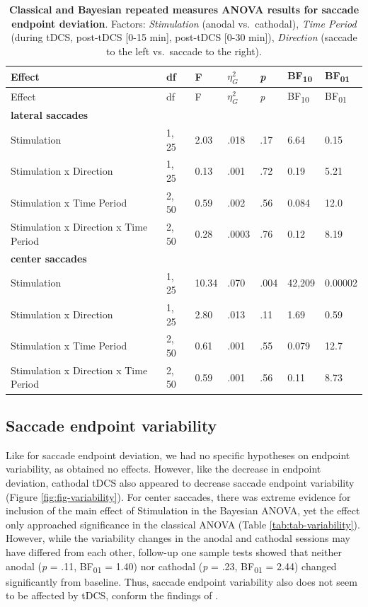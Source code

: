 \documentclass[11pt,english,]{memoir}
\begin{document}
\begin{longtable}[]{@{}lllllll@{}}
\caption{\label{tab:tab-deviation} \textbf{Classical and Bayesian repeated measures ANOVA results for saccade endpoint deviation}. Factors: \emph{Stimulation} (anodal vs.~cathodal), \emph{Time Period} (during tDCS, post-tDCS {[}0-15 min{]}, post-tDCS {[}0-30 min{]}), \emph{Direction} (saccade to the left vs.~saccade to the right).}\tabularnewline
\toprule
Effect & df & F & \(\eta_{G}^{2}\) & \emph{p} & BF\textsubscript{10} & BF\textsubscript{01}\tabularnewline
\midrule
\endfirsthead
\toprule
Effect & df & F & \(\eta_{G}^{2}\) & \emph{p} & BF\textsubscript{10} & BF\textsubscript{01}\tabularnewline
\midrule
\endhead
\textbf{lateral saccades} & & & & & &\tabularnewline
Stimulation & 1, 25 & 2.03 & .018 & .17 & 6.64 & 0.15\tabularnewline
Stimulation x Direction & 1, 25 & 0.13 & .001 & .72 & 0.19 & 5.21\tabularnewline
Stimulation x Time Period & 2, 50 & 0.59 & .002 & .56 & 0.084 & 12.0\tabularnewline
Stimulation x Direction x Time Period & 2, 50 & 0.28 & .0003 & .76 & 0.12 & 8.19\tabularnewline
\textbf{center saccades} & & & & & &\tabularnewline
Stimulation & 1, 25 & 10.34 & .070 & .004 & 42,209 & 0.00002\tabularnewline
Stimulation x Direction & 1, 25 & 2.80 & .013 & .11 & 1.69 & 0.59\tabularnewline
Stimulation x Time Period & 2, 50 & 0.61 & .001 & .55 & 0.079 & 12.7\tabularnewline
Stimulation x Direction x Time Period & 2, 50 & 0.59 & .001 & .56 & 0.11 & 8.73\tabularnewline
\bottomrule
\end{longtable}

\endgroup

\hypertarget{saccade-endpoint-variability}{%
\subsection{Saccade endpoint variability}\label{saccade-endpoint-variability}}

Like for saccade endpoint deviation, we had no specific hypotheses on endpoint variability, as \textcite{Kanai2012} obtained no effects. However, like the decrease in endpoint deviation, cathodal tDCS also appeared to decrease saccade endpoint variability (Figure \ref{fig:fig-variability}). For center saccades, there was extreme evidence for inclusion of the main effect of Stimulation in the Bayesian ANOVA, yet the effect only approached significance in the classical ANOVA (Table \ref{tab:tab-variability}). However, while the variability changes in the anodal and cathodal sessions may have differed from each other, follow-up one sample tests showed that neither anodal (\emph{p} = .11, BF\textsubscript{01} = 1.40) nor cathodal (\emph{p} = .23, BF\textsubscript{01} = 2.44) changed significantly from baseline. Thus, saccade endpoint variability also does not seem to be affected by tDCS, conform the findings of \textcite{Kanai2012}.
\end{document}

